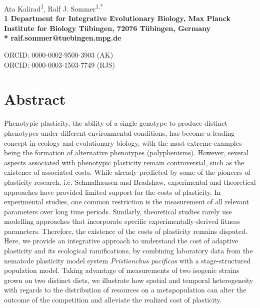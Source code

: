 \documentclass[10pt,letterpaper]{article}
\begin{document}
\vspace*{0.35in}

\begin{flushleft}
{\Large
\textbf{}}
\newline


Ata Kalirad\textsuperscript{1},
Ralf J. Sommer\textsuperscript{1,*}
\\
\bigskip
\bf{1} Department for Integrative Evolutionary Biology, Max Planck Institute for Biology T{\"u}bingen, 72076 T{\"u}bingen, Germany
\\

\bigskip
* ralf.sommer@tuebingen.mpg.de

\bigskip
ORCID: 0000-0002-9500-3903 (AK) \\
ORCID: 0000-0003-1503-7749 (RJS)

\end{flushleft}


\section*{Abstract}

Phenotypic plasticity, the ability of a single genotype to produce distinct phenotypes under different environmental conditions, has become a leading concept in ecology and evolutionary biology, with the most extreme examples being the formation of alternative phenotypes (polyphenisms). However, several aspects associated with phenotypic plasticity remain controversial, such as the existence of associated costs. While already predicted by some of the pioneers of plasticity research, i.e. Schmalhausen and Bradshaw, experimental and theoretical approaches have provided limited support for the costs of plasticity. In experimental studies, one common restriction is the measurement of all relevant parameters over long time periods. Similarly, theoretical studies rarely use modelling approaches that incorporate specific experimentally-derived fitness parameters. Therefore, the existence of the costs of plasticity remains disputed. Here, we provide an integrative approach to understand the cost of adaptive plasticity and its ecological ramifications, by combining laboratory data from the nematode plasticity model system \emph{Pristionchus pacificus} with a stage-structured population model. Taking advantage of measurements of two isogenic strains grown on two distinct diets, we illustrate how spatial and temporal heterogeneity with regards to the distribution of resources on a metapopulation can alter the outcome of the competition and alleviate the realized cost of plasticity.
\end{document}
